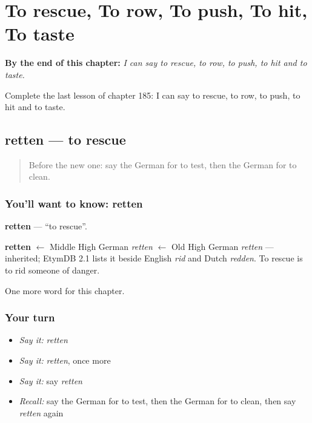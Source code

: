 
\chapter{To rescue, To row, To push, To hit, To taste}
\label{ch:ge-to-rescue-to-row-to-push-to-hit-to-taste}

\begin{chapteropening}
\textbf{By the end of this chapter:} \emph{I can say to rescue, to row, to push, to hit and to taste.}

Complete the last lesson of chapter 185: I can say to rescue, to row, to push, to hit and to taste.
\end{chapteropening}

\section[retten]{retten — to rescue}

\label{lesson:GE-C185-retten}



\begin{quote}
Before the new one: say the German for to test, then the German for to clean.
\end{quote}

\subsection*{You'll want to know: retten}
\textbf{retten} — \textquotedblleft{}to rescue\textquotedblright{}.

\begin{cousinweb}
\textbf{retten} $\leftarrow$ Middle High German \emph{retten} $\leftarrow$ Old High German \emph{retten} — inherited; EtymDB 2.1 lists it beside English \emph{rid} and Dutch \emph{redden}. To rescue is to rid someone of danger.
\end{cousinweb}

\begin{grammarlens}[title={What you've built}]
One more word for this chapter.
\end{grammarlens}

\subsection*{Your turn}
\begin{itemize}
\raggedright
  \item \emph{Say it:} \emph{retten}
  \item \emph{Say it:} \emph{retten}, once more
  \item \emph{Say it:} say \emph{retten}
  \item \emph{Recall:} say the German for to test, then the German for to clean, then say \emph{retten} again
\end{itemize}

